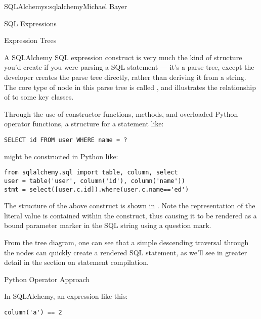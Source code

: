 \begin{aosachapter}{SQLAlchemy}{s:sqlalchemy}{Michael Bayer}
\begin{aosasect1}{SQL Expressions}
\begin{aosasect2}{Expression Trees}

A SQLAlchemy SQL expression construct is very much the kind of structure
you'd create if you were parsing a SQL statement --- it's a parse tree,
except the developer creates the parse tree directly, rather than
deriving it from a string.   The core type of node in this parse
tree is called , and  illustrates the relationship
of  to some key classes.


Through the use of constructor functions, methods, and overloaded Python
operator functions, a structure for a statement like:

\begin{verbatim}
SELECT id FROM user WHERE name = ?
\end{verbatim}

might be constructed in Python like:

\begin{verbatim}
from sqlalchemy.sql import table, column, select
user = table('user', column('id'), column('name'))
stmt = select([user.c.id]).where(user.c.name=='ed')
\end{verbatim}

The structure of the above  construct is shown in .
Note the representation of the literal value  is contained
within the  construct, thus causing it to be rendered
as a bound parameter marker in the SQL string using a question mark.


From the tree diagram, one can see that a simple descending traversal through
the nodes can quickly create a rendered SQL statement, as we'll see in greater
detail in the section on statement compilation.

\end{aosasect2}

\begin{aosasect2}{Python Operator Approach}

In SQLAlchemy, an expression like this:

\begin{verbatim}
column('a') == 2
\end{verbatim}


\end{aosasect2}
\end{aosasect1}
\end{aosachapter}
